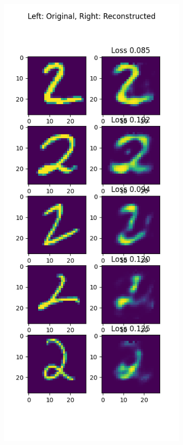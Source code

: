 \begin{solve}
\begin{figure}[H]
\begin{subfigure}{.5\textwidth}
\end{subfigure}
\end{figure}
\begin{figure}[H]
\begin{subfigure}{.5\textwidth}
    \centering
    \includegraphics[width=.9\linewidth]{plots/output_2.png}

\end{subfigure}
\end{figure}
\end{solve}
